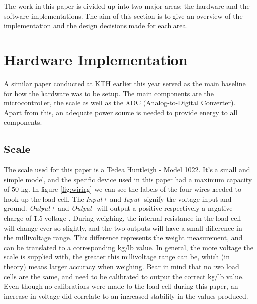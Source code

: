 




The work in this paper is divided up into two major areas; the hardware and the software implementations. The aim of this section is to give an overview of the implementation and the design decisions made for each area.

\section{Hardware Implementation}

A similar paper conducted at KTH earlier this year served as the main baseline for how the hardware was to be setup.\cite{hospital} The main components are the microcontroller, the scale as well as the ADC (Analog-to-Digital Converter). Apart from this, an adequate power source is needed to provide energy to all components. 


\subsection{Scale}
The scale used for this paper is a Tedea Huntleigh - Model 1022. It's a small and simple model, and the specific device used in this paper had a maximum capacity of \~50 kg.\cite{load-cell-data} In figure \ref{fig:wiring} we can see the labels of the four wires needed to hook up the load cell. The \textit{Input+} and \textit{Input-} signify the voltage input and ground. \cite{load-cell-spec} \textit{Output+} and \textit{Output-} will output a positive respectively a negative charge of \~1.5 voltage . During weighing, the internal resistance in the load cell will change ever so slightly, and the two outputs will have a small difference in the millivoltage range. This difference represents the weight measurement, and can be translated to a corresponding kg/lb value. In general, the more voltage the scale is supplied with, the greater this millivoltage range can be, which (in theory) means larger accuracy when weighing. Bear in mind that no two load cells are the same, and need to be calibrated to output the correct kg/lb value. Even though no calibrations were made to the load cell during this paper, an increase in voltage did correlate to an increased stability in the values produced. 

